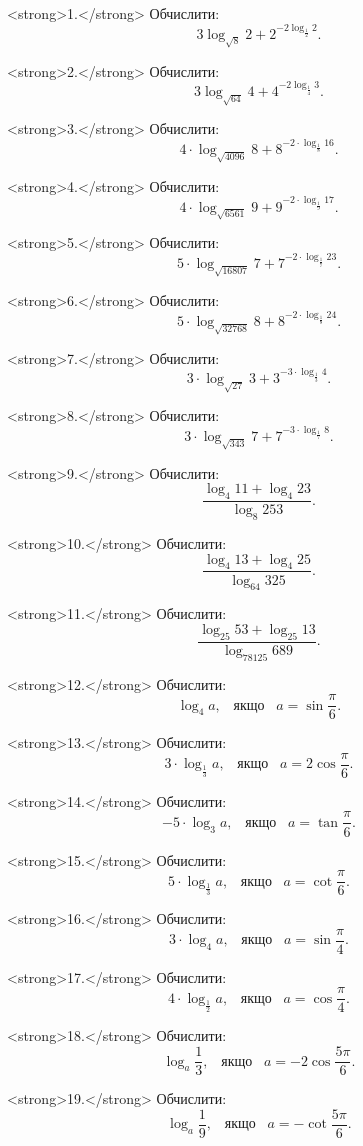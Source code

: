 <strong>1.</strong> Обчислити:
$$3 \log_{\sqrt{8}} 2 + 2^{-2\log_{\frac{1}{2}} 2}.$$

<strong>2.</strong> Обчислити:
$$3\log_{\sqrt{64}} 4 + 4^{-2\log_{\frac{1}{4}} 3}.$$

<strong>3.</strong> Обчислити:
$$4\cdot\log_{\sqrt{4096}}8+8^{-2\cdot\log_{\frac{1}{8}}16}.$$

<strong>4.</strong> Обчислити:
$$4\cdot\log_{\sqrt{6561}}9+9^{-2\cdot\log_{\frac{1}{9}}17}.$$

<strong>5.</strong> Обчислити:
$$5\cdot\log_{\sqrt{16807}}7+7^{-2\cdot\log_{\frac{1}{7}}23}.$$

<strong>6.</strong> Обчислити:
$$5\cdot\log_{\sqrt{32768}}8+8^{-2\cdot\log_{\frac{1}{8}}24}.$$

<strong>7.</strong> Обчислити:
$$3\cdot\log_{\sqrt{27}}3+3^{-3\cdot\log_{\frac{1}{3}}4}.$$

<strong>8.</strong> Обчислити:
$$3\cdot\log_{\sqrt{343}}7+7^{-3\cdot\log_{\frac{1}{7}}8}.$$

<strong>9.</strong> Обчислити:
$$\frac{\log_4 11 + \log_4 23}{\log_8 253}.$$

<strong>10.</strong> Обчислити:
$$\dfrac{\log_{4}13+\log_{4}25}{\log_{64}325}.$$

<strong>11.</strong> Обчислити:
$$\dfrac{\log_{25}53+\log_{25}13}{\log_{78125}{689}}.$$

<strong>12.</strong> Обчислити:
$$\log_4 a, \;\;\; \mbox{якщо} \;\;\; a=\sin\dfrac{\pi}{6}.$$

<strong>13.</strong> Обчислити:
$$3\cdot\log_{\frac{1}{3}}a, \;\;\; \mbox{якщо} \;\;\; a=2\cos\dfrac{\pi}{6}.$$

<strong>14.</strong> Обчислити:
$$-5\cdot\log_{3}a, \;\;\; \mbox{якщо} \;\;\; a=\tan\dfrac{\pi}{6}.$$

<strong>15.</strong> Обчислити:
$$5\cdot\log_{\frac{1}{3}}a, \;\;\; \mbox{якщо} \;\;\; a=\cot\dfrac{\pi}{6}.$$

<strong>16.</strong> Обчислити:
$$3\cdot\log_{4}a, \;\;\; \mbox{якщо} \;\;\; a=\sin\dfrac{\pi}{4}.$$

<strong>17.</strong> Обчислити:
$$4\cdot\log_{\frac{1}{2}}a, \;\;\; \mbox{якщо} \;\;\; a=\cos\dfrac{\pi}{4}.$$

<strong>18.</strong> Обчислити:
$$\log_{a}\dfrac{1}{3}, \;\;\; \mbox{якщо} \;\;\; a=-2\cos\dfrac{5\pi}{6}.$$

<strong>19.</strong> Обчислити:
$$\log_{a}\dfrac{1}{9}, \;\;\; \mbox{якщо} \;\;\; a=-\cot\dfrac{5\pi}{6}.$$

